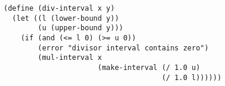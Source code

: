 \documentclass[a4paper,12pt]{article}
\begin{document}
\begin{lstlisting}
(define (div-interval x y)
  (let ((l (lower-bound y))
        (u (upper-bound y)))
    (if (and (<= l 0) (>= u 0))
        (error "divisor interval contains zero")
        (mul-interval x
                      (make-interval (/ 1.0 u)
                                     (/ 1.0 l))))))
\end{lstlisting}
\end{document}
